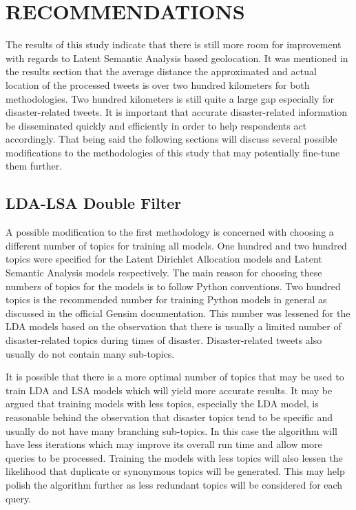 \chapter{RECOMMENDATIONS}
The results of this study indicate that there is still more room for improvement with regards to Latent Semantic Analysis based geolocation. It was mentioned in the results section that the average distance   the approximated and actual location of the processed tweets is over two hundred kilometers for both methodologies. Two hundred kilometers is still quite a large gap especially for disaster-related tweets. It is important that accurate disaster-related information be disseminated quickly and efficiently in order to help respondents act accordingly. That being said the following sections will discuss several possible modifications to the methodologies of this study that may potentially fine-tune them further.

\section{LDA-LSA Double Filter}
A possible modification to the first methodology is concerned with choosing a different number of topics for training all models. One hundred and two hundred topics were specified for the Latent Dirichlet Allocation models and Latent Semantic Analysis models respectively. The main reason for choosing these numbers of topics for the models is to follow Python conventions. Two hundred topics is the recommended number for training Python models in general as discussed in the official Gensim documentation. This number was lessened for the LDA models based on the observation that there is usually a limited number of disaster-related topics during times of disaster. Disaster-related tweets also usually do not contain many sub-topics. 

It is possible that there is a more optimal number of topics that may be used to train LDA and LSA models which will yield more accurate results. It may be argued that training models with less topics, especially the LDA model, is reasonable behind the observation that disaster topics tend to be specific and usually do not have many branching sub-topics. In this case the algorithm will have less iterations which may improve its overall run    time and allow more queries to be processed. Training the models with less topics will also lessen the likelihood that duplicate or synonymous topics
will be generated. This may help polish the algorithm further as less redundant topics will be considered for each query.

